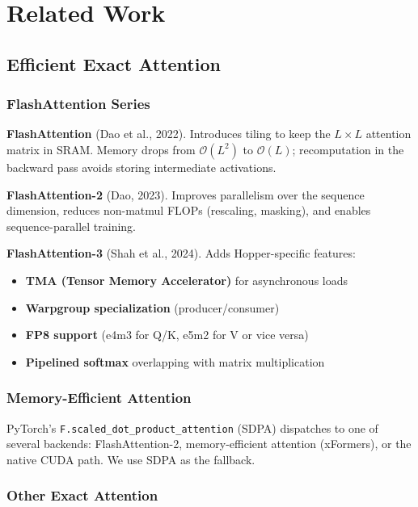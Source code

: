 
\section{Related Work}

\subsection{Efficient Exact Attention}

\subsubsection{FlashAttention Series}

\textbf{FlashAttention} (Dao et al., 2022). Introduces tiling to keep the 
$L \times L$ attention matrix in SRAM. Memory drops from $\mathcal{O}(L^2)$ 
to $\mathcal{O}(L)$; recomputation in the backward pass avoids storing 
intermediate activations.

\textbf{FlashAttention-2} (Dao, 2023). Improves parallelism over the sequence 
dimension, reduces non-matmul FLOPs (rescaling, masking), and enables 
sequence-parallel training.

\textbf{FlashAttention-3} (Shah et al., 2024). Adds Hopper-specific features:
\begin{itemize}
\item \textbf{TMA (Tensor Memory Accelerator)} for asynchronous loads
\item \textbf{Warpgroup specialization} (producer/consumer)
\item \textbf{FP8 support} (e4m3 for Q/K, e5m2 for V or vice versa)
\item \textbf{Pipelined softmax} overlapping with matrix multiplication

\end{itemize}
\subsubsection{Memory-Efficient Attention}

PyTorch's \texttt{F.scaled\_dot\_product\_attention} (SDPA) dispatches to one of 
several backends: FlashAttention-2, memory-efficient attention (xFormers), 
or the native CUDA path. We use SDPA as the fallback.

\subsubsection{Other Exact Attention}

